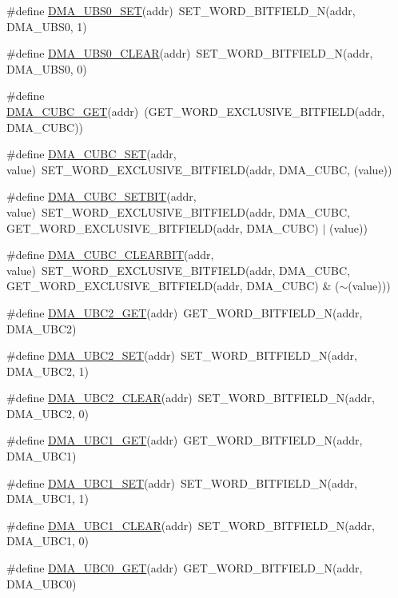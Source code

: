 \begin{DoxyCompactItemize}
\item 
\#define \hyperlink{a00548_a72b0dfbac2f270a03fc1c8ab2be235a0}{DMA\_\-UBS0\_\-SET}(addr)~SET\_\-WORD\_\-BITFIELD\_\-N(addr, DMA\_\-UBS0, 1)
\item 
\#define \hyperlink{a00548_a05872cb711a77e489d1f480df93bbe58}{DMA\_\-UBS0\_\-CLEAR}(addr)~SET\_\-WORD\_\-BITFIELD\_\-N(addr, DMA\_\-UBS0, 0)
\item 
\#define \hyperlink{a00548_a1b0eafa3e6668d850bb5b39c7094a888}{DMA\_\-CUBC\_\-GET}(addr)~(GET\_\-WORD\_\-EXCLUSIVE\_\-BITFIELD(addr, DMA\_\-CUBC))
\item 
\#define \hyperlink{a00548_a2c3a7360c4e6c81e6a5e2e8802ea771c}{DMA\_\-CUBC\_\-SET}(addr, value)~SET\_\-WORD\_\-EXCLUSIVE\_\-BITFIELD(addr, DMA\_\-CUBC, (value))
\item 
\#define \hyperlink{a00548_a24d9609e7cf23368d2f032b2626b40ad}{DMA\_\-CUBC\_\-SETBIT}(addr, value)~SET\_\-WORD\_\-EXCLUSIVE\_\-BITFIELD(addr, DMA\_\-CUBC, GET\_\-WORD\_\-EXCLUSIVE\_\-BITFIELD(addr, DMA\_\-CUBC) $|$ (value))
\item 
\#define \hyperlink{a00548_a6b29a90a6eaaf4516d7b1811f324dcea}{DMA\_\-CUBC\_\-CLEARBIT}(addr, value)~SET\_\-WORD\_\-EXCLUSIVE\_\-BITFIELD(addr, DMA\_\-CUBC, GET\_\-WORD\_\-EXCLUSIVE\_\-BITFIELD(addr, DMA\_\-CUBC) \& ($\sim$(value)))
\item 
\#define \hyperlink{a00548_a7543f13f6e938c8f56c00c4937771bf0}{DMA\_\-UBC2\_\-GET}(addr)~GET\_\-WORD\_\-BITFIELD\_\-N(addr, DMA\_\-UBC2)
\item 
\#define \hyperlink{a00548_a1e93cafa4ff512c5786b3f06693fe904}{DMA\_\-UBC2\_\-SET}(addr)~SET\_\-WORD\_\-BITFIELD\_\-N(addr, DMA\_\-UBC2, 1)
\item 
\#define \hyperlink{a00548_af0cd9df92303f02e79bf5f8c768f887e}{DMA\_\-UBC2\_\-CLEAR}(addr)~SET\_\-WORD\_\-BITFIELD\_\-N(addr, DMA\_\-UBC2, 0)
\item 
\#define \hyperlink{a00548_ab40c738d0f30bd17e298fb4d7c25cf90}{DMA\_\-UBC1\_\-GET}(addr)~GET\_\-WORD\_\-BITFIELD\_\-N(addr, DMA\_\-UBC1)
\item 
\#define \hyperlink{a00548_a62a22d5adbb6b7667b6554bece8a9869}{DMA\_\-UBC1\_\-SET}(addr)~SET\_\-WORD\_\-BITFIELD\_\-N(addr, DMA\_\-UBC1, 1)
\item 
\#define \hyperlink{a00548_a334e451bd305502bd002d7353d7c8835}{DMA\_\-UBC1\_\-CLEAR}(addr)~SET\_\-WORD\_\-BITFIELD\_\-N(addr, DMA\_\-UBC1, 0)
\item 
\#define \hyperlink{a00548_a2a90400bc44a1cad0fee54fff1bc3a2f}{DMA\_\-UBC0\_\-GET}(addr)~GET\_\-WORD\_\-BITFIELD\_\-N(addr, DMA\_\-UBC0)

\end{DoxyCompactItemize}
